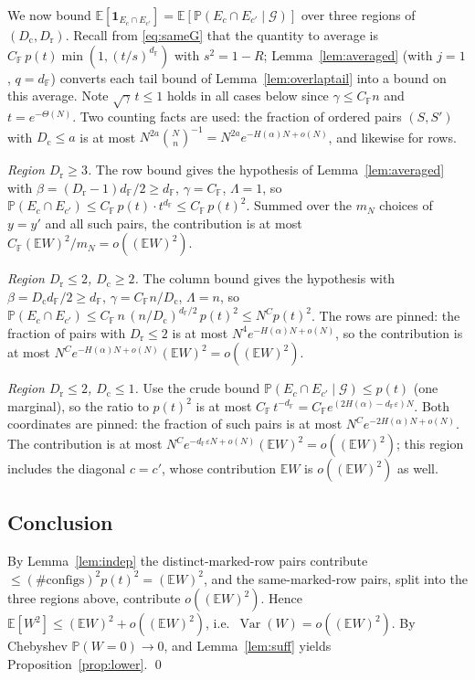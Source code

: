 \documentclass[11pt,reqno]{amsart}
\theoremstyle{plain}
\theoremstyle{definition}
\theoremstyle{remark}
\newcommand{\F}{\mathbb{F}}
\newcommand{\PP}{\mathbb{P}}
\newcommand{\EE}{\mathbb{E}}
\newcommand{\one}{\mathbf{1}}
\newcommand{\dF}{d_{\F}}
\DeclareMathOperator{\Var}{Var}
\begin{document}
We now bound $\EE[\one_{E_c\cap E_{c'}}]=\EE[\PP(E_c\cap E_{c'}\mid\mathcal G)]$ over three regions
of $(D_{\mathrm c},D_{\mathrm r})$. Recall from \eqref{eq:sameG} that the quantity to average is
$C_\F\,p(t)\min(1,(t/s)^{\dF})$ with $s^2=1-R$; Lemma~\ref{lem:averaged} (with $j=1$, $q=\dF$)
converts each tail bound of Lemma~\ref{lem:overlaptail} into a bound on this average. Note
$\sqrt\gamma\,t\le1$ holds in all cases below since $\gamma\le C_\F n$ and $t=e^{-\Theta(N)}$. Two
counting facts are used: the fraction of ordered pairs $(S,S')$ with $D_{\mathrm c}\le a$ is at most
$N^{2a}\binom Nn^{-1}=N^{2a}e^{-H(\alpha)N+o(N)}$, and likewise for rows.

\emph{Region $D_{\mathrm r}\ge3$.} The row bound gives the hypothesis of Lemma~\ref{lem:averaged}
with $\beta=(D_{\mathrm r}-1)\dF/2\ge\dF$, $\gamma=C_\F$, $\Lambda=1$, so
$\PP(E_c\cap E_{c'})\le C_\F\,p(t)\cdot t^{\dF}\le C_\F\,p(t)^2$. Summed over the $m_N$ choices of
$y=y'$ and all such pairs, the contribution is at most $C_\F(\EE W)^2/m_N=o((\EE W)^2)$.

\emph{Region $D_{\mathrm r}\le2$, $D_{\mathrm c}\ge2$.} The column bound gives the hypothesis with
$\beta=D_{\mathrm c}\dF/2\ge\dF$, $\gamma=C_\F n/D_{\mathrm c}$, $\Lambda=n$, so $\PP(E_c\cap
E_{c'})\le C_\F\,n\,(n/D_{\mathrm c})^{\dF/2}\,p(t)^2\le N^{C}p(t)^2$. The rows are pinned:
the fraction of pairs with $D_{\mathrm r}\le2$ is at most $N^{4}e^{-H(\alpha)N+o(N)}$, so the
contribution is at most $N^{C}e^{-H(\alpha)N+o(N)}(\EE W)^2=o((\EE W)^2)$.

\emph{Region $D_{\mathrm r}\le2$, $D_{\mathrm c}\le1$.} Use the crude bound $\PP(E_c\cap
E_{c'}\mid\mathcal G)\le p(t)$ (one marginal), so the ratio to $p(t)^2$ is at most
$C_\F\,t^{-\dF}=C_\F e^{(2H(\alpha)-\dF\varepsilon)N}$. Both coordinates are pinned: the fraction of
such pairs is at most $N^{C}e^{-2H(\alpha)N+o(N)}$. The contribution is at most
$N^{C}e^{-\dF\varepsilon N+o(N)}(\EE W)^2=o((\EE W)^2)$; this region includes the diagonal $c=c'$,
whose contribution $\EE W$ is $o((\EE W)^2)$ as well.

\subsection{Conclusion}
By Lemma~\ref{lem:indep} the distinct-marked-row pairs contribute $\le(\#\text{configs})^2p(t)^2=(\EE
W)^2$, and the same-marked-row pairs, split into the three regions above, contribute $o((\EE W)^2)$.
Hence $\EE[W^2]\le(\EE W)^2+o((\EE W)^2)$, i.e.\ $\Var(W)=o((\EE W)^2)$. By Chebyshev $\PP(W=0)\to0$,
and Lemma~\ref{lem:suff} yields Proposition~\ref{prop:lower}. \qed
\end{document}
